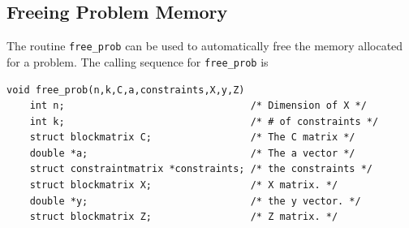 \documentclass{article}
\begin{document}
\subsection*{Freeing Problem Memory}
The routine {\tt free\_prob} can be used to automatically 
free the memory allocated for a problem.  The calling sequence
for {\tt free\_prob} is

\begin{verbatim}
void free_prob(n,k,C,a,constraints,X,y,Z)
    int n;                                /* Dimension of X */
    int k;                                /* # of constraints */
    struct blockmatrix C;                 /* The C matrix */
    double *a;                            /* The a vector */
    struct constraintmatrix *constraints; /* the constraints */
    struct blockmatrix X;                 /* X matrix. */ 
    double *y;                            /* the y vector. */
    struct blockmatrix Z;                 /* Z matrix. */
\end{verbatim}


 
\end{document}
